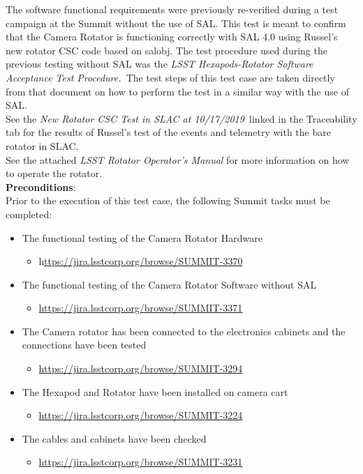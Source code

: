 \documentclass[SE,lsstdraft,STR,toc]{lsstdoc}
\providecommand{\tightlist}{
  \setlength{\itemsep}{0pt}\setlength{\parskip}{0pt}}
\begin{document}
The software functional requirements were previously re-verified during
a test campaign at the Summit without the use of SAL. This test is meant
to confirm that the Camera Rotator is functioning correctly with SAL 4.0
using Russel's new rotator CSC code based on salobj. The test procedure
used during the previous testing without SAL was the \emph{LSST
Hexapods-Rotator Software Acceptance Test Procedure.~}The test steps of
this test case are taken directly from that document on how to perform
the test in a similar way with the use of SAL.\\[2\baselineskip]See the
\emph{New Rotator CSC Test in SLAC at 10/17/2019~}linked in the
Traceability tab for the results of Russel's test of the events and
telemetry with the bare rotator in SLAC.\\[2\baselineskip]See the
attached \emph{LSST Rotator Operator's Manual} for more information on
how to operate the rotator.\\[2\baselineskip]


\textbf{ Preconditions}:\\
Prior to the execution of this test case, the following Summit tasks
must be completed:

\begin{itemize}
\tightlist
\item
  The functional testing of the Camera Rotator Hardware~

  \begin{itemize}
  \tightlist
  \item
    h\href{https://jira.lsstcorp.org/browse/SUMMIT-3370}{ttps://jira.lsstcorp.org/browse/SUMMIT-3370}
  \end{itemize}
\item
  The functional testing of the Camera Rotator Software without SAL

  \begin{itemize}
  \tightlist
  \item
    \url{https://jira.lsstcorp.org/browse/SUMMIT-3371}
  \end{itemize}
\item
  The Camera rotator has been connected to the electronics cabinets and
  the connections have been tested

  \begin{itemize}
  \tightlist
  \item
    \url{https://jira.lsstcorp.org/browse/SUMMIT-3294}
  \end{itemize}
\item
  The Hexapod and Rotator have been installed on camera cart

  \begin{itemize}
  \tightlist
  \item
    \url{https://jira.lsstcorp.org/browse/SUMMIT-3224}
  \end{itemize}
\item
  The cables and cabinets have been checked

  \begin{itemize}
  \tightlist
  \item
    \url{https://jira.lsstcorp.org/browse/SUMMIT-3231}
  \end{itemize}
\end{itemize}
\end{document}
